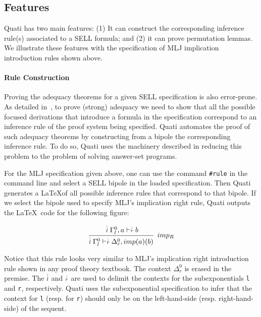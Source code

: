 \documentclass{llncs}
\newcommand{\ndots}[1]{\stackrel{\vcenter{\hbox{$\scriptstyle :$}\vskip-.35ex}}
   {\hbox {$ \scriptstyle {#1}$}}}
\begin{document}

\subsection{Features}

Quati has two main features: (1) It can construct the corresponding inference rule(s) associated
to a SELL formula; and (2) it can prove permutation lemmas. We illustrate these features with 
the specification of MLJ implication introduction rules shown above.

\vspace{-2mm}

\paragraph{Rule Construction} Proving the adequacy theorems for a given SELL specification is also 
error-prone. As detailed in~\cite{nigam.jlc}, to prove (strong) adequacy we need to show that all 
the possible focused derivations that introduce a formula in the specification correspond to 
an inference rule of the proof system being specified. Quati automates the proof of such 
adequacy theorems by constructing from a bipole the corresponding inference rule. 
To do so, Quati uses the machinery described in \cite{nigam13iclp,nigam14ebl} reducing
this problem to the problem of solving answer-set programs. 

For the MLJ specification given above, one can use the command \texttt{\#rule} in the command 
line and select a SELL bipole in the loaded specification. Then Quati generates
a \LaTeX of all possible inference rules that correspond to that bipole. If we select the bipole used to specify 
MLJ's implication right rule, Quati outputs the \LaTeX\ code for the following figure:
\vspace{-3mm}

{\small
\[
\cfrac{ \ndots{l} \Gamma_{l}^{0}, a \vdash  \ndots{r} b}
{ \ndots{l} \Gamma_{l}^{0} \vdash  \ndots{r} \Delta_{r}^{0}, imp (a) (b) } \;\; imp_{R}
\]
}

Notice that this rule looks very similar to MLJ's implication right introduction rule shown in any proof theory 
textbook. The context $\Delta_{r}^{0}$ is erased in the premise. The $\ndots{l}$ and $\ndots{r}$ are used to 
delimit the contexts for the subexponentials \texttt{l} and \texttt{r}, respectively. Quati uses the subexponential 
specification to infer that the context for \texttt{l} (resp. for \texttt{r})
should only be on the left-hand-side (resp. right-hand-side) of the sequent.
\end{document}
